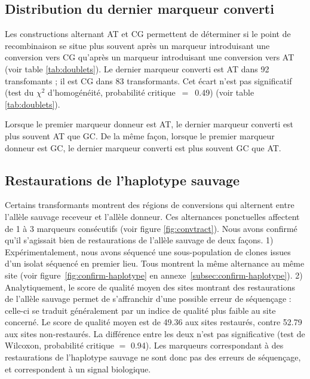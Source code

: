 \subsection{Distribution du dernier marqueur converti}
\label{subsec:distribution-points}

Les constructions alternant AT et CG permettent de déterminer si le point de
recombinaison se situe plus souvent après un marqueur introduisant une
conversion vers CG qu'après un marqueur introduisant une conversion vers AT
(voir table \ref{tab:doublets}). Le dernier marqueur converti est AT dans 92
transfomants ; il est CG dans 83 transformants. Cet écart n'est pas significatif
(test du \(\chi^2\) d'homogénéité, probabilité critique~\(=\)~\num{0.49}) (voir
table \ref{tab:doublets}).

Lorsque le premier marqueur donneur est AT, le dernier marqueur converti est
plus souvent AT que GC. De la même façon, lorsque le premier marqueur donneur
est GC, le dernier marqueur converti est plus souvent GC que AT.


\subsection{Restaurations de l'haplotype sauvage}
\label{subsec:restaur}

Certains transformants montrent des régions de conversions qui alternent entre
l'allèle sauvage receveur et l'allèle donneur. Ces alternances ponctuelles
affectent de 1 à 3 marqueurs consécutifs (voir figure \ref{fig:convtract}). Nous
avons confirmé qu'il s'agissait bien de restaurations de l'allèle sauvage de
deux façons. 1) Expérimentalement, nous avons séquencé une sous-population de
clones issues d'un isolat séquencé en premier lieu. Tous montrent la même
alternance au même site (voir figure~\ref{fig:confirm-haplotype} en
annexe~\ref{subsec:confirm-haplotype}). 2) Analytiquement, le score de qualité
moyen des sites montrant des restaurations de l'allèle sauvage permet de
s'affranchir d'une possible erreur de séquençage : celle-ci se traduit
généralement par un indice de qualité plus faible au site concerné. Le score de
qualité moyen est de \num{49.36} aux sites restaurés, contre \num{52.79} aux
sites non-restaurés. La différence entre les deux n'est pas significative (test
de Wilcoxon, probabilité critique \(=\) \num{0.94}). Les marqueurs correspondant
à des restaurations de l'haplotype sauvage ne sont donc pas des erreurs de
séquençage, et correspondent à un signal biologique.


